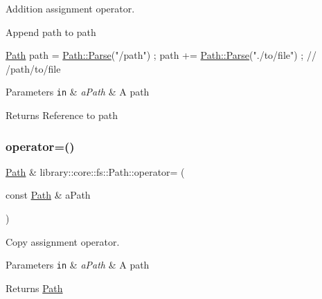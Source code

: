 Addition assignment operator. 

Append path to path


\begin{DoxyCode}
\hyperlink{classlibrary_1_1core_1_1fs_1_1_path_aabc4240fc08479d1bff6b9753f2b5cc2}{Path} path = \hyperlink{classlibrary_1_1core_1_1fs_1_1_path_a6ba644b6609507e724c217bf2020f5ae}{Path::Parse}(\textcolor{stringliteral}{"/path"}) ;
path += \hyperlink{classlibrary_1_1core_1_1fs_1_1_path_a6ba644b6609507e724c217bf2020f5ae}{Path::Parse}(\textcolor{stringliteral}{"./to/file"}) ; \textcolor{comment}{// /path/to/file}
\end{DoxyCode}



\begin{DoxyParams}[1]{Parameters}
\mbox{\tt in}  & {\em a\+Path} & A path \\
\hline
\end{DoxyParams}
\begin{DoxyReturn}{Returns}
Reference to path 
\end{DoxyReturn}
\mbox{\label{classlibrary_1_1core_1_1fs_1_1_path_a23879402c7612f8374251613acfe0f62}} 
\subsubsection{\texorpdfstring{operator=()}{operator=()}}
{\footnotesize\ttfamily \hyperlink{classlibrary_1_1core_1_1fs_1_1_path}{Path} \& library\+::core\+::fs\+::\+Path\+::operator= (\begin{DoxyParamCaption}\item[{const \hyperlink{classlibrary_1_1core_1_1fs_1_1_path}{Path} \&}]{a\+Path }\end{DoxyParamCaption})}



Copy assignment operator. 


\begin{DoxyParams}[1]{Parameters}
\mbox{\tt in}  & {\em a\+Path} & A path \\
\hline
\end{DoxyParams}
\begin{DoxyReturn}{Returns}
\hyperlink{classlibrary_1_1core_1_1fs_1_1_path}{Path} 
\end{DoxyReturn}
\mbox{\label{classlibrary_1_1core_1_1fs_1_1_path_add705556eb4509ab2868e322490a1e35}} 
